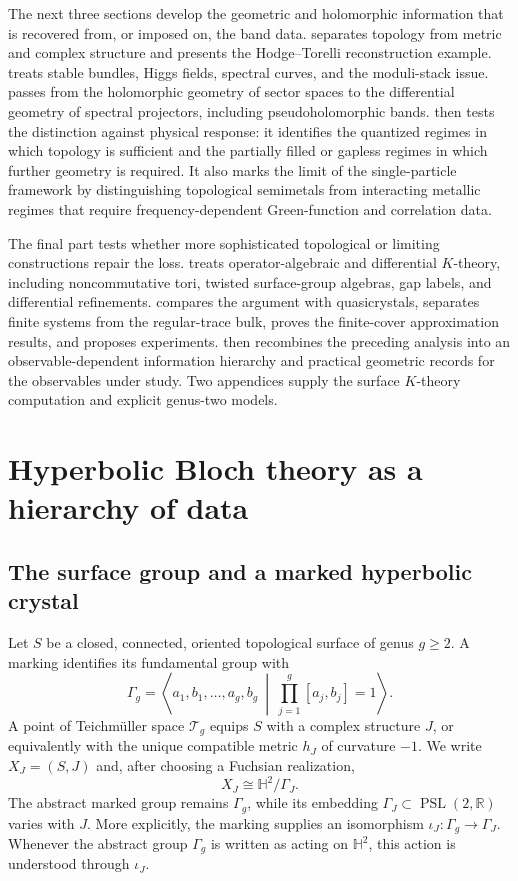 \documentclass[11pt]{article}
\theoremstyle{definition}
\theoremstyle{remark}
\newcommand{\HH}{\mathbb H}
\newcommand{\RR}{\mathbb R}
\newcommand{\cT}{\mathcal T}
\begin{document}
The next three sections develop the geometric and holomorphic information
that is recovered from, or imposed on, the band data.
 separates topology from metric and complex
structure and presents the Hodge--Torelli reconstruction example.
 treats stable bundles, Higgs fields, spectral curves,
and the moduli-stack issue.   passes from the
holomorphic geometry of sector spaces to the differential geometry of
spectral projectors, including pseudoholomorphic bands.
 then tests the distinction against physical response:
it identifies the quantized regimes in which topology is sufficient and the
partially filled or gapless regimes in which further geometry is required.
It also marks the limit of the single-particle framework by distinguishing
topological semimetals from interacting metallic regimes that require
frequency-dependent Green-function and correlation data.

The final part tests whether more sophisticated topological or limiting
constructions repair the loss.   treats
operator-algebraic and differential \(K\)-theory, including noncommutative
tori, twisted surface-group algebras, gap labels, and differential
refinements.   compares the argument with
quasicrystals, separates finite systems from the regular-trace bulk, proves
the finite-cover approximation results, and proposes experiments.
 then recombines the preceding analysis into an
observable-dependent information hierarchy and practical geometric records
for the observables under study.  Two appendices supply the surface
\(K\)-theory computation and explicit genus-two models.

\section{Hyperbolic Bloch theory as a hierarchy of data}
\label{sec:bloch-data}

\subsection{The surface group and a marked hyperbolic crystal}

Let \(S\) be a closed, connected, oriented topological surface of genus
\(g\geq2\).  A marking identifies its fundamental group with
\[
 \Gamma_g=
 \left\langle
 a_1,b_1,\ldots,a_g,b_g\ \middle|\
 \prod_{j=1}^{g}[a_j,b_j]=1
 \right\rangle.
 \tag{2.1}\label{eq:surface-group}
\]
A point of Teichm\"uller space \(\cT_g\) equips \(S\) with a complex structure
\(J\), or equivalently with the unique compatible metric \(h_J\) of curvature
\(-1\).  We write \(X_J=(S,J)\) and, after choosing a Fuchsian realization,
\[
               X_J\cong \HH^2/\Gamma_J .
\]
The abstract marked group remains \(\Gamma_g\), while its embedding
\(\Gamma_J\subset\operatorname{PSL}(2,\RR)\) varies with \(J\).
More explicitly, the marking supplies an isomorphism
\(\iota_J:\Gamma_g\to\Gamma_J\).  Whenever the abstract group
\(\Gamma_g\) is written as acting on \(\HH^2\), this action is understood
through \(\iota_J\).
\end{document}
